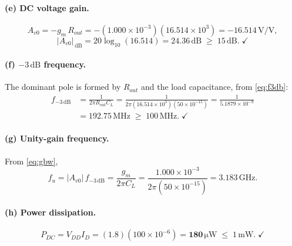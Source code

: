 \documentclass[12pt,a4paper]{article}
\newcommand{\U}[1]{\,\mathrm{#1}}
\begin{document}
\paragraph{(e) DC voltage gain.}
\[
A_{v0} = -g_m\,R_{out}
       = -(1.000\times10^{-3})(16.514\times10^{3})
       = \mathbf{-16.514\U{V/V}},
\]
\[
|A_{v0}|_{\U{dB}} = 20\log_{10}(16.514) = \mathbf{24.36\U{dB}}
\;\geq\; 15\U{dB}.\;\checkmark
\]

\paragraph{(f) $-3\U{dB}$ frequency.}
The dominant pole is formed by $R_{out}$ and the load capacitance,
from \eqref{eq:f3db}:
\begin{align*}
f_{-3\U{dB}} &= \frac{1}{2\pi R_{out} C_L}
              = \frac{1}{2\pi (16.514\times10^{3})(50\times10^{-15})}
              = \frac{1}{5.1879\times10^{-9}}\\[2pt]
             &= \mathbf{192.75\U{MHz}} \;\geq\; 100\U{MHz}.\;\checkmark
\end{align*}

\paragraph{(g) Unity-gain frequency.}
From \eqref{eq:gbw},
\[
f_{u} = |A_{v0}|\,f_{-3\U{dB}} = \frac{g_m}{2\pi C_L}
      = \frac{1.000\times10^{-3}}{2\pi(50\times10^{-15})}
      = \mathbf{3.183\U{GHz}} .
\]

\paragraph{(h) Power dissipation.}
\[
P_{DC} = V_{DD} I_D = (1.8)(100\times10^{-6}) = \mathbf{180\U{\mu W}}
\;\leq\; 1\U{mW}.\;\checkmark
\]
\end{document}
